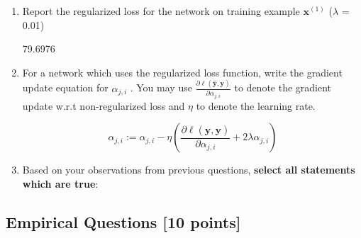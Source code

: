 \documentclass[11pt]{article}
\numberwithin{equation}{section} %
\numberwithin{figure}{section} %
\numberwithin{table}{section} %
\newcommand{\xv}{\mathbf{x}}
\newcommand{\yv}{\mathbf{y}}
\newcommand{\points}[1]{{\bf [#1 points]}}
\begin{document}
\begin{enumerate}
\begin{enumerate}
    
    \item Report the regularized loss for the network on training example $\xv^{(1)}$ ($\lambda$ = 0.01)
    \begin{tcolorbox}[fit,height=1cm, width=2cm, blank, borderline={1pt}{-2pt}]
            79.6976
        \end{tcolorbox}
    
    
     \item For a network which uses the regularized loss function, write the gradient update equation for $\alpha_{j,i}$ . You may use $\frac{\partial \ell(\hat{\yv},\yv)}{\partial \alpha_{j,i}}$ to denote the gradient update w.r.t non-regularized loss and $\eta$ to denote the learning rate.
    \begin{tcolorbox}[fit,height=3cm, width=10cm, blank, borderline={1pt}{-2pt}]
            \begin{equation}\nonumber
            \alpha_{j,i} := \alpha_{j,i} - \eta(\frac{\partial \ell(\hat{\yv},\yv)}{\partial \alpha_{j,i}} + 2\lambda \alpha_{j,i})
            \end{equation}
        \end{tcolorbox}
    
    
    \clearpage
    
    \item Based on your observations from previous questions, \textbf{select all statements which are true}:
    
    
\end{enumerate}
 

\end{enumerate}




\clearpage
\subsection{Empirical Questions \points{10}}
\label{sec:interp}
\end{document}

